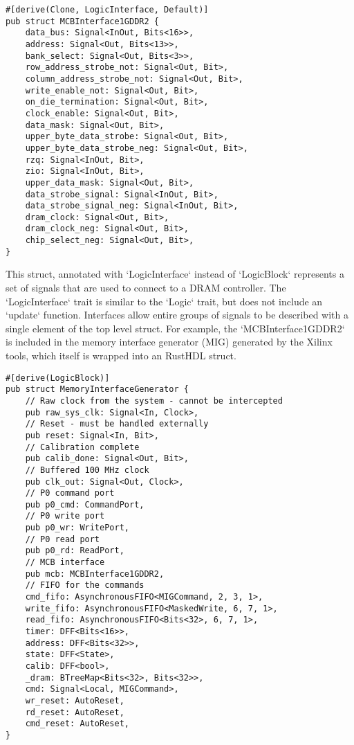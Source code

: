 \documentclass[conference]{IEEEtran}
\begin{document}
\begin{verbatim}
#[derive(Clone, LogicInterface, Default)]
pub struct MCBInterface1GDDR2 {
    data_bus: Signal<InOut, Bits<16>>,
    address: Signal<Out, Bits<13>>,
    bank_select: Signal<Out, Bits<3>>,
    row_address_strobe_not: Signal<Out, Bit>,
    column_address_strobe_not: Signal<Out, Bit>,
    write_enable_not: Signal<Out, Bit>,
    on_die_termination: Signal<Out, Bit>,
    clock_enable: Signal<Out, Bit>,
    data_mask: Signal<Out, Bit>,
    upper_byte_data_strobe: Signal<Out, Bit>,
    upper_byte_data_strobe_neg: Signal<Out, Bit>,
    rzq: Signal<InOut, Bit>,
    zio: Signal<InOut, Bit>,
    upper_data_mask: Signal<Out, Bit>,
    data_strobe_signal: Signal<InOut, Bit>,
    data_strobe_signal_neg: Signal<InOut, Bit>,
    dram_clock: Signal<Out, Bit>,
    dram_clock_neg: Signal<Out, Bit>,
    chip_select_neg: Signal<Out, Bit>,
}
\end{verbatim}

This struct, annotated with `LogicInterface` instead of `LogicBlock` represents a set of signals that are used
to connect to a DRAM controller.  The `LogicInterface` trait is similar to the `Logic` trait, but does not include
an `update` function.  Interfaces allow entire groups of signals to be described with a single element of the
top level struct.  For example, the `MCBInterface1GDDR2` is included in the memory interface generator (MIG) generated 
by the Xilinx tools, which itself is wrapped into an RustHDL struct.

\begin{verbatim}
#[derive(LogicBlock)]
pub struct MemoryInterfaceGenerator {
    // Raw clock from the system - cannot be intercepted
    pub raw_sys_clk: Signal<In, Clock>,
    // Reset - must be handled externally
    pub reset: Signal<In, Bit>,
    // Calibration complete
    pub calib_done: Signal<Out, Bit>,
    // Buffered 100 MHz clock
    pub clk_out: Signal<Out, Clock>,
    // P0 command port
    pub p0_cmd: CommandPort,
    // P0 write port
    pub p0_wr: WritePort,
    // P0 read port
    pub p0_rd: ReadPort,
    // MCB interface
    pub mcb: MCBInterface1GDDR2,
    // FIFO for the commands
    cmd_fifo: AsynchronousFIFO<MIGCommand, 2, 3, 1>,
    write_fifo: AsynchronousFIFO<MaskedWrite, 6, 7, 1>,
    read_fifo: AsynchronousFIFO<Bits<32>, 6, 7, 1>,
    timer: DFF<Bits<16>>,
    address: DFF<Bits<32>>,
    state: DFF<State>,
    calib: DFF<bool>,
    _dram: BTreeMap<Bits<32>, Bits<32>>,
    cmd: Signal<Local, MIGCommand>,
    wr_reset: AutoReset,
    rd_reset: AutoReset,
    cmd_reset: AutoReset,
}
\end{verbatim}  
\end{document}
